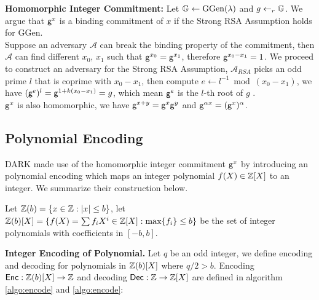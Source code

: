 \textbf{Homomorphic Integer Commitment:} Let $\mathbb{G} \gets \mathrm{GGen}(\lambda)$ and $g \gets_r \mathbb{G}$. We argue that $\mathsf{g}^x$ is a binding commitment of $x$ if the Strong RSA Assumption holds for $\mathrm{GGen}$. \\
Suppose an adversary $\mathcal{A}$ can break the binding property of the commitment, then $\mathcal{A}$ can find different $x_0$, $x_1$ such that $\mathsf{g}^{x_0} = \mathsf{g}^{x_1}$, therefore $\mathsf{g}^{x_0 - x_1} = 1$. We proceed to construct an adversary for the Strong RSA Assumption, $\mathcal{A}_{RSA}$ picks an odd prime $l$ that is coprime with $x_0 - x_1$, then compute $e \gets l^{-1} \bmod (x_0 - x_1)$, we have $(\mathsf{g}^e)^l = \mathsf{g}^{1 + k(x_0 - x_1)} = g$, which mean $\mathsf{g}^e$ is the $l$-th root of $g$ \cite{bunz2020transparent}. \\
$\mathsf{g}^x$ is also homomorphic, we have $\mathsf{g}^{x+y} = \mathsf{g}^x \mathsf{g}^y$ and $\mathsf{g}^{\alpha x} = (\mathsf{g}^x)^\alpha$.

\subsection{Polynomial Encoding}
\label{section-polynomial-encoding}

DARK made use of the homomorphic integer commitment $\mathsf{g}^x$ by introducing an polynomial encoding which maps an integer polynomial $f(X) \in \mathbb{Z}[X]$ to an integer.  We summarize their construction below.

\begin{definition}
\label{bounded-integer}
Let $\mathbb{Z}(b) = \{x \in \mathbb{Z} : |x| \le b\}$, let $\mathbb{Z}(b)[X] = \{ f(X) = \sum f_i X^i \in \mathbb{Z}[X] : \mathrm{max}\{f_i\} \le b \}$ be the set of integer polynomials with coefficients in $[-b, b]$.
\end{definition}

\textbf{Integer Encoding of Polynomial.} Let $q$ be an odd integer, we define encoding and decoding for polynomials in $\mathbb{Z}(b)[X]$ where $q/2 > b$. Encoding $\mathsf{Enc}: \mathbb{Z}(b)[X] \to \mathbb{Z}$ and decoding $\mathsf{Dec}: \mathbb{Z} \to \mathbb{Z}[X]$ are defined in algorithm \ref{algo:encode} and \ref{algo:encode}:


